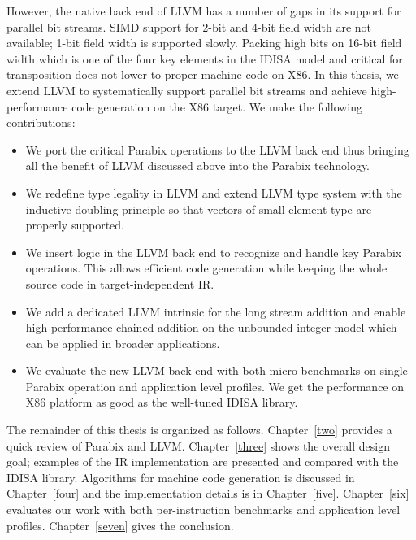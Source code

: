 However, the native back end of LLVM has a number of gaps in its support for parallel bit streams. SIMD support for 2-bit and 4-bit field width are not available; 1-bit field width is supported slowly. Packing high bits on 16-bit field width which is one of the four key elements in the IDISA model and critical for transposition does not lower to proper machine code on X86. In this thesis, we extend LLVM to systematically support parallel bit streams and achieve high-performance code generation on the X86 target. We make the following contributions:

\begin{itemize}
  \item We port the critical Parabix operations to the LLVM back end thus bringing all the benefit of LLVM discussed above into the Parabix technology.
  \item We redefine type legality in LLVM and extend LLVM type system with the inductive doubling principle so that vectors of small element type are properly supported.
  \item We insert logic in the LLVM back end to recognize and handle key Parabix operations. This allows efficient code generation while keeping the whole source code in target-independent IR\@.
  \item We add a dedicated LLVM intrinsic for the long stream addition and enable high-performance chained addition on the unbounded integer model which can be applied in broader applications.
  \item We evaluate the new LLVM back end with both micro benchmarks on single Parabix operation and application level profiles. We get the performance on X86 platform as good as the well-tuned IDISA library.
\end{itemize}

The remainder of this thesis is organized as follows. Chapter~\ref{two} provides a quick review of Parabix and LLVM\@. Chapter~\ref{three} shows the overall design goal; examples of the IR implementation are presented and compared with the IDISA library. Algorithms for machine code generation is discussed in Chapter~\ref{four} and the implementation details is in Chapter~\ref{five}. Chapter~\ref{six} evaluates our work with both per-instruction benchmarks and application level profiles. Chapter~\ref{seven} gives the conclusion.

